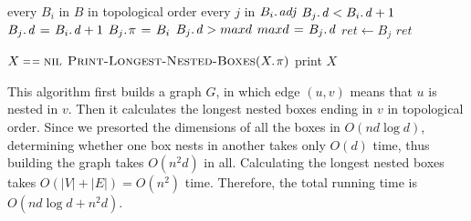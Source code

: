 \documentclass[a4paper,11pt,twocolumn]{article}
\newcommand{\NIL}{\const{nil}}
\begin{document}
\begin{enumerate}
\begin{codebox}
                \End
           \End
      \End
  \li \For every $B_i$ in $B$ in topological order
  \li \Do  \For every $j$ in $\attrib{B_i}{adj}$
  \li      \If  $\attrib{B_j}{d} < \attrib{B_i}{d} + 1$
  \li      \Do  $\attrib{B_j}{d} \gets \attrib{B_i}{d} + 1$
  \li           $\attrib{B_j}{\pi} \gets B_i$
  \li           \If $\attrib{B_j}{d} > maxd$
  \li           \Do $maxd \gets \attrib{B_j}{d}$
  \li               $ret \gets B_j$
                \End
           \End
      \End
  \li \Return $ret$
  \end{codebox}
  \begin{codebox}
  \li \If $X \isequal \NIL$
  \li \Do \Return
      \End
  \li $\proc{Print-Longest-Nested-Boxes}(\attrib{X}{\pi})$
  \li print $X$
  \end{codebox}
  
  This algorithm first builds a graph $G$, in which edge $(u, v)$ means that $u$ is nested in $v$. Then it calculates the longest nested boxes ending in $v$ in topological order. Since we presorted the dimensions of all the boxes in $O(nd \log d)$, determining whether one box nests in another takes only $O(d)$ time, thus building the graph takes $O(n^2d)$ in all. Calculating the longest nested boxes takes $O(|V|+|E|) = O(n^2)$ time. Therefore, the total running time is $O(nd \log d + n^2d)$.
  \end{enumerate}
  
\end{document}

